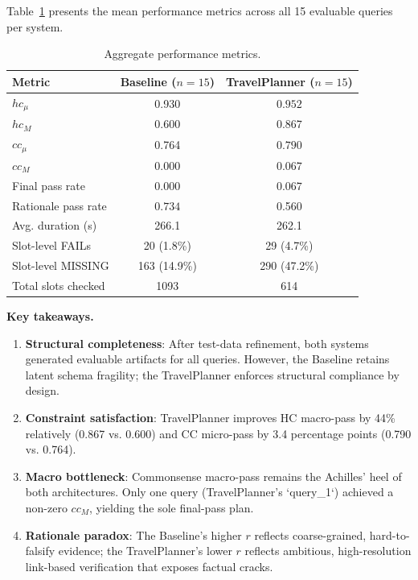 \documentclass[a4paper,oneside,bibliography=totoc]{scrbook}
\begin{document}
Table~\ref{tab:aggregates} presents the mean performance metrics across all 15 evaluable queries per system.

\begin{table}[htbp]
\centering
\caption{Aggregate performance metrics.}
\label{tab:aggregates}
\begin{tabular}{@{}lcc@{}}
\toprule
\textbf{Metric} & \textbf{Baseline} ($n=15$) & \textbf{TravelPlanner} ($n=15$) \\
\midrule
$hc_\mu$ & 0.930 & $\mathbf{0.952}$ \\
$hc_M$ & 0.600 & $\mathbf{0.867}$ \\
$cc_\mu$ & 0.764 & $\mathbf{0.790}$ \\
$cc_M$ & 0.000 & $\mathbf{0.067}$ \\
Final pass rate & 0.000 & $\mathbf{0.067}$ \\
Rationale pass rate & $\mathbf{0.734}$ & 0.560 \\
Avg. duration (s) & 266.1 & 262.1 \\
Slot-level FAILs & 20 (1.8\%) & 29 (4.7\%) \\
Slot-level MISSING & 163 (14.9\%) & 290 (47.2\%) \\
Total slots checked & 1093 & 614 \\
\bottomrule
\end{tabular}
\end{table}

\textbf{Key takeaways.}
\begin{enumerate}
    \item \textbf{Structural completeness}: After test-data refinement, both systems generated evaluable artifacts for all queries. However, the Baseline retains latent schema fragility; the TravelPlanner enforces structural compliance by design.
    \item \textbf{Constraint satisfaction}: TravelPlanner improves HC macro-pass by 44\% relatively (0.867 vs. 0.600) and CC micro-pass by 3.4 percentage points (0.790 vs. 0.764).
    \item \textbf{Macro bottleneck}: Commonsense macro-pass remains the Achilles' heel of both architectures. Only one query (TravelPlanner's `query\_1`) achieved a non-zero $cc_M$, yielding the sole final-pass plan.
    \item \textbf{Rationale paradox}: The Baseline's higher $r$ reflects coarse-grained, hard-to-falsify evidence; the TravelPlanner's lower $r$ reflects ambitious, high-resolution link-based verification that exposes factual cracks.
\end{enumerate}
\end{document}

